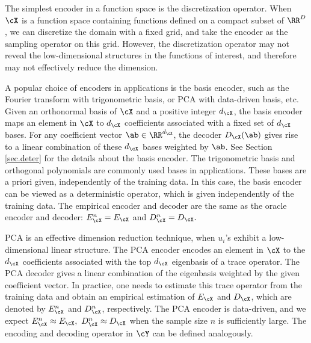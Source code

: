 \documentclass[11pt]{article} %
\begin{document}
The simplest encoder in a function space is the discretization operator. When $\cX$ is a function space containing functions defined on a compact subset of $\RR^D$, we can discretize the domain with a fixed grid, and take the encoder as the sampling operator on this grid. However, the discretization operator may not reveal the low-dimensional structures in the functions of interest, and therefore may not effectively reduce the dimension.


A popular choice of encoders in applications is the basis encoder, such as the Fourier transform with trigonometric basis, or PCA with data-driven basis, etc.
Given an orthonormal basis of $\cX$ and a positive integer $d_{\cX}$, the basis encoder maps an element in $\cX$ to $d_{\cX}$ coefficients associated with a fixed set of $d_{\cX}$ bases. For any coefficient vector $\ab\in \RR^{d_{\cX}}$, the decoder $D_{\cX}(\ab)$ gives rise to a linear combination of these $d_{\cX}$  bases weighted by $\ab$. See Section \ref{sec.deter} for the details about the basis encoder. The trigonometric basis and orthogonal polynomials are commonly used bases in applications. These bases are a priori given, independently of the training data.  In this case, the basis encoder can be viewed as a deterministic operator, which is given independently of the training data. The empirical encoder and decoder are the same as the oracle encoder and decoder:
$
E_{\cX}^n=E_{\cX}$ and $D_{\cX}^n=D_{\cX}.
$


PCA \citep{pearson1901liii,hotelling1933analysis,hotelling1992relations} is an effective dimension reduction technique, when $u_i$'s exhibit a low-dimensional linear structure.
The PCA encoder encodes an element in $\cX$ to the $d_{\cX}$ coefficients associated with the top $d_{\cX}$ eigenbasis of a trace operator. The PCA decoder gives a linear combination of the eigenbasis weighted by the given coefficient vector.
In practice, one needs to estimate this trace operator from the training data and obtain an empirical estimation of $E_{\cX}$ and $D_{\cX}$, which are denoted by $E_{\cX}^n$ and $D_{\cX}^n$, respectively.
The PCA encoder is data-driven, and we expect $
E_{\cX}^n \approx E_{\cX}, \ D_{\cX}^n \approx D_{\cX}
$
when the sample size $n$ is sufficiently large.
The encoding and decoding operator in $\cY$ can be defined analogously. 
\end{document}
